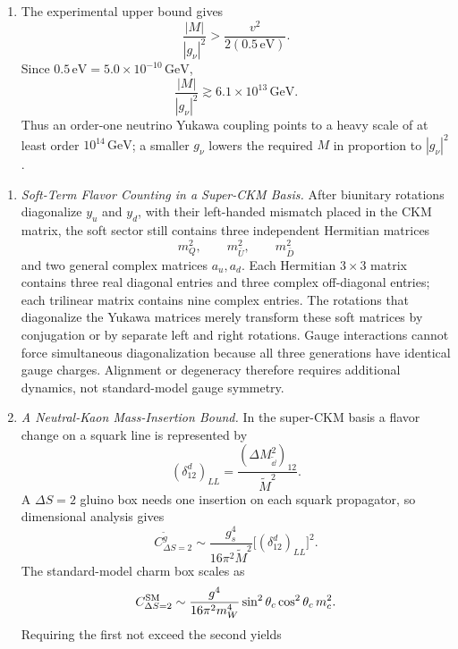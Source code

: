 \begin{enumerate}
\begin{enumerate}
    \item The experimental upper bound gives
      \[
        \frac{|M|}{|g_\nu|^2}
          >\frac{v^2}{2(0.5\,\mathrm{eV})}.
      \]
      Since \(0.5\,\mathrm{eV}=5.0\times10^{-10}\,\mathrm{GeV}\),
      \[
        \frac{|M|}{|g_\nu|^2}
          \gtrsim6.1\times10^{13}\,\mathrm{GeV}.
      \]
      Thus an order-one neutrino Yukawa coupling points to a heavy scale of
      at least order \(10^{14}\,\mathrm{GeV}\); a smaller \(g_\nu\) lowers
      the required \(M\) in proportion to \(|g_\nu|^2\).
  \end{enumerate}

  \begin{enumerate}
    \item \emph{Soft-Term Flavor Counting in a Super-CKM Basis.}
    After biunitary rotations diagonalize \(y_u\) and \(y_d\), with their
      left-handed mismatch placed in the CKM matrix, the soft sector still
      contains three independent Hermitian matrices
      \[
        m_Q^2,\qquad m_{\bar U}^2,\qquad m_{\bar D}^2
      \]
      and two general complex matrices \(a_u,a_d\).  Each Hermitian
      \(3\times3\) matrix contains three real diagonal entries and three
      complex off-diagonal entries; each trilinear matrix contains nine
      complex entries.  The rotations that diagonalize the Yukawa matrices
      merely transform these soft matrices by conjugation or by separate
      left and right rotations.  Gauge interactions cannot force simultaneous
      diagonalization because all three generations have identical gauge
      charges.  Alignment or degeneracy therefore requires additional
      dynamics, not standard-model gauge symmetry.
    \item \emph{A Neutral-Kaon Mass-Insertion Bound.}
    In the super-CKM basis a flavor change on a squark line is represented
      by
      \[
        (\delta^d_{12})_{LL}
          =\frac{(\Delta M_{\widetilde \dd}^2)_{12}}{\widetilde M^2}.
      \]
      A \(\Delta S=2\) gluino box needs one insertion on each squark
      propagator, so dimensional analysis gives
      \[
        C_{\Delta S=2}^{\widetilde g}
          \sim\frac{g_s^4}{16\pi^2\widetilde M^2}
            \bigl[(\delta^d_{12})_{LL}\bigr]^2.
      \]
      The standard-model charm box scales as
      \[
        C_{\Delta S=2}^{\rm SM}
          \sim\frac{g^4}{16\pi^2m_W^4}
            \sin^2\theta_c\cos^2\theta_c\,m_c^2.
      \]
      Requiring the first not exceed the second yields
      \[
\]
\end{enumerate}
\end{enumerate}
